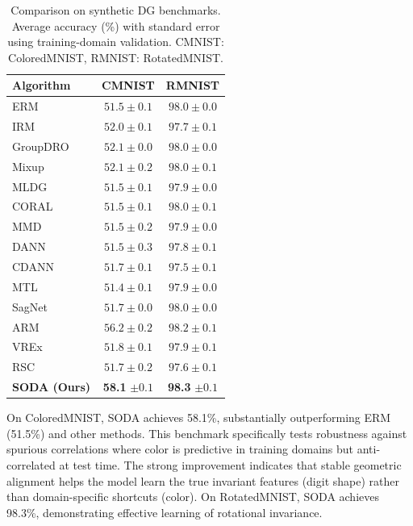 \begin{table}[t]
\caption{Comparison on synthetic DG benchmarks. Average accuracy (\%) with standard error using training-domain validation. CMNIST: ColoredMNIST, RMNIST: RotatedMNIST.}
\label{tab:synthetic_results}
\centering
\small
\renewcommand{\arraystretch}{1.1}
\begin{tabular}{lcc}
\toprule
\textbf{Algorithm} & \textbf{CMNIST} & \textbf{RMNIST} \\
\midrule
ERM \citep{vapnik1999nature} & $51.5 \pm 0.1$ & $98.0 \pm 0.0$ \\
IRM \citep{arjovsky2019invariant} & $52.0 \pm 0.1$ & $97.7 \pm 0.1$ \\
GroupDRO \citep{sagawa2019distributionally} & $52.1 \pm 0.0$ & $98.0 \pm 0.0$ \\
Mixup \citep{yan2020improve} & $52.1 \pm 0.2$ & $98.0 \pm 0.1$ \\
MLDG \citep{li2018learning_meta} & $51.5 \pm 0.1$ & $97.9 \pm 0.0$ \\
CORAL \citep{sun2016deep} & $51.5 \pm 0.1$ & $98.0 \pm 0.1$ \\
MMD \citep{li2018domain_mmd} & $51.5 \pm 0.2$ & $97.9 \pm 0.0$ \\
DANN \citep{ganin2016domain} & $51.5 \pm 0.3$ & $97.8 \pm 0.1$ \\
CDANN \citep{li2018deep_cdann} & $51.7 \pm 0.1$ & $97.5 \pm 0.1$ \\
MTL \citep{blanchard2021domain} & $51.4 \pm 0.1$ & $97.9 \pm 0.0$ \\
SagNet \citep{nam2021reducing} & $51.7 \pm 0.0$ & $98.0 \pm 0.0$ \\
ARM \citep{zhang2021adaptive} & $56.2 \pm 0.2$ & $98.2 \pm 0.1$ \\
VREx \citep{krueger2021out} & $51.8 \pm 0.1$ & $97.9 \pm 0.1$ \\
RSC \citep{huang2020self} & $51.7 \pm 0.2$ & $97.6 \pm 0.1$ \\
\midrule
\textbf{SODA (Ours)} & \textbf{58.1} $\pm 0.1$ & \textbf{98.3} $\pm 0.1$ \\
\bottomrule
\end{tabular}
\end{table}

On ColoredMNIST, SODA achieves 58.1\%, substantially outperforming ERM (51.5\%) and other methods. This benchmark specifically tests robustness against spurious correlations where color is predictive in training domains but anti-correlated at test time. The strong improvement indicates that stable geometric alignment helps the model learn the true invariant features (digit shape) rather than domain-specific shortcuts (color). On RotatedMNIST, SODA achieves 98.3\%, demonstrating effective learning of rotational invariance.

